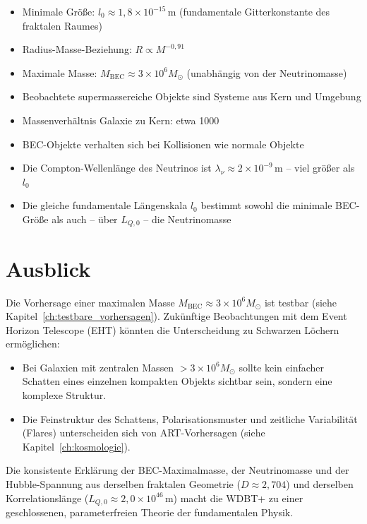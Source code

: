 \begin{itemize}
    \item Minimale Größe: \( l_0 \approx 1,8 \times 10^{-15} \, \text{m} \) (fundamentale Gitterkonstante des fraktalen Raumes)
    \item Radius-Masse-Beziehung: \( R \propto M^{-0,91} \)
    \item Maximale Masse: \( M_{\text{BEC}} \approx 3 \times 10^6 M_{\odot} \) (unabhängig von der Neutrinomasse)
    \item Beobachtete supermassereiche Objekte sind Systeme aus Kern und Umgebung
    \item Massenverhältnis Galaxie zu Kern: etwa 1000
    \item BEC-Objekte verhalten sich bei Kollisionen wie normale Objekte
    \item Die Compton-Wellenlänge des Neutrinos ist \( \lambda_\nu \approx 2 \times 10^{-9} \, \text{m} \) – viel größer als \( l_0 \)
    \item Die gleiche fundamentale Längenskala \( l_0 \) bestimmt sowohl die minimale BEC-Größe als auch – über \( L_{Q,0} \) – die Neutrinomasse
\end{itemize}

\section{Ausblick}
\label{app:bec_ausblick}

Die Vorhersage einer maximalen Masse \( M_{\text{BEC}} \approx 3 \times 10^6 M_{\odot} \) ist testbar (siehe Kapitel~\ref{ch:testbare_vorhersagen}). Zukünftige Beobachtungen mit dem Event Horizon Telescope (EHT) könnten die Unterscheidung zu Schwarzen Löchern ermöglichen:

\begin{itemize}
    \item Bei Galaxien mit zentralen Massen \( > 3 \times 10^6 M_{\odot} \) sollte kein einfacher Schatten eines einzelnen kompakten Objekts sichtbar sein, sondern eine komplexe Struktur.
    \item Die Feinstruktur des Schattens, Polarisationsmuster und zeitliche Variabilität (Flares) unterscheiden sich von ART-Vorhersagen (siehe Kapitel~\ref{ch:kosmologie}).
\end{itemize}

Die konsistente Erklärung der BEC-Maximalmasse, der Neutrinomasse und der Hubble-Spannung aus derselben fraktalen Geometrie (\( D \approx 2,704 \)) und derselben Korrelationslänge (\( L_{Q,0} \approx 2{,}0 \times 10^{46} \, \text{m} \)) macht die WDBT+ zu einer geschlossenen, parameterfreien Theorie der fundamentalen Physik.